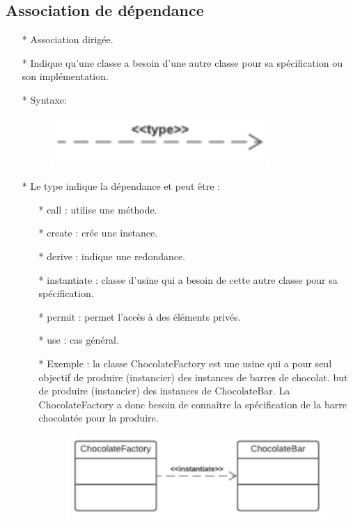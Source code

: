 \documentclass[12pt]{article}
\begin{document}
\subsection{Association de dépendance}
\begin{itemize}
	\item[* ]  Association dirigée.
	\item[* ] Indique qu'une classe a besoin d'une autre classe pour sa spécification ou son
	implémentation.
	\item[* ] Syntaxe:
	\begin{figure}[!hbtp]
		\centering
		\includegraphics[scale=0.75]{Capture20.PNG}
	\end{figure}
\item[* ] Le type indique la dépendance et peut être :
\begin{itemize}
	\item[* ] call : utilise une méthode.
	\item[* ] create : crée une instance.
	\item[* ] derive : indique une redondance.
	\item[* ] instantiate : classe d'usine qui a besoin de cette autre classe pour sa spécification.
	\item[* ] permit : permet l'accès à des éléments privés.
	\item[* ] use : cas général.
	\item[* ] Exemple : la classe ChocolateFactory est une usine qui a pour seul objectif de produire (instancier) des instances de barres de chocolat.
	but de produire (instancier) des instances de ChocolateBar.
	La ChocolateFactory a donc besoin de connaître la spécification de la
	barre chocolatée pour la produire.
	\newpage
		\begin{figure}[!hbtp]
		\centering
		\includegraphics[scale=0.75]{Capture21.PNG}
	\end{figure}
\end{itemize}
\end{itemize}
\end{document}
